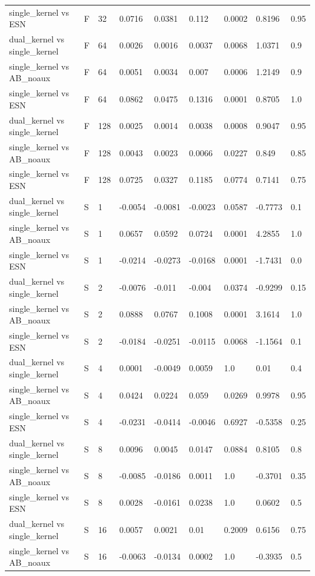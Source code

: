 \begin{table}
\begin{ruledtabular}
\begin{tabular}{lllllllll}
single_kernel vs ESN & F & 32 & 0.0716 & 0.0381 & 0.112 & 0.0002 & 0.8196 & 0.95 \\
dual_kernel vs single_kernel & F & 64 & 0.0026 & 0.0016 & 0.0037 & 0.0068 & 1.0371 & 0.9 \\
single_kernel vs AB_noaux & F & 64 & 0.0051 & 0.0034 & 0.007 & 0.0006 & 1.2149 & 0.9 \\
single_kernel vs ESN & F & 64 & 0.0862 & 0.0475 & 0.1316 & 0.0001 & 0.8705 & 1.0 \\
dual_kernel vs single_kernel & F & 128 & 0.0025 & 0.0014 & 0.0038 & 0.0008 & 0.9047 & 0.95 \\
single_kernel vs AB_noaux & F & 128 & 0.0043 & 0.0023 & 0.0066 & 0.0227 & 0.849 & 0.85 \\
single_kernel vs ESN & F & 128 & 0.0725 & 0.0327 & 0.1185 & 0.0774 & 0.7141 & 0.75 \\
dual_kernel vs single_kernel & S & 1 & -0.0054 & -0.0081 & -0.0023 & 0.0587 & -0.7773 & 0.1 \\
single_kernel vs AB_noaux & S & 1 & 0.0657 & 0.0592 & 0.0724 & 0.0001 & 4.2855 & 1.0 \\
single_kernel vs ESN & S & 1 & -0.0214 & -0.0273 & -0.0168 & 0.0001 & -1.7431 & 0.0 \\
dual_kernel vs single_kernel & S & 2 & -0.0076 & -0.011 & -0.004 & 0.0374 & -0.9299 & 0.15 \\
single_kernel vs AB_noaux & S & 2 & 0.0888 & 0.0767 & 0.1008 & 0.0001 & 3.1614 & 1.0 \\
single_kernel vs ESN & S & 2 & -0.0184 & -0.0251 & -0.0115 & 0.0068 & -1.1564 & 0.1 \\
dual_kernel vs single_kernel & S & 4 & 0.0001 & -0.0049 & 0.0059 & 1.0 & 0.01 & 0.4 \\
single_kernel vs AB_noaux & S & 4 & 0.0424 & 0.0224 & 0.059 & 0.0269 & 0.9978 & 0.95 \\
single_kernel vs ESN & S & 4 & -0.0231 & -0.0414 & -0.0046 & 0.6927 & -0.5358 & 0.25 \\
dual_kernel vs single_kernel & S & 8 & 0.0096 & 0.0045 & 0.0147 & 0.0884 & 0.8105 & 0.8 \\
single_kernel vs AB_noaux & S & 8 & -0.0085 & -0.0186 & 0.0011 & 1.0 & -0.3701 & 0.35 \\
single_kernel vs ESN & S & 8 & 0.0028 & -0.0161 & 0.0238 & 1.0 & 0.0602 & 0.5 \\
dual_kernel vs single_kernel & S & 16 & 0.0057 & 0.0021 & 0.01 & 0.2009 & 0.6156 & 0.75 \\
single_kernel vs AB_noaux & S & 16 & -0.0063 & -0.0134 & 0.0002 & 1.0 & -0.3935 & 0.5 \\

\end{tabular}
\end{ruledtabular}
\end{table}
